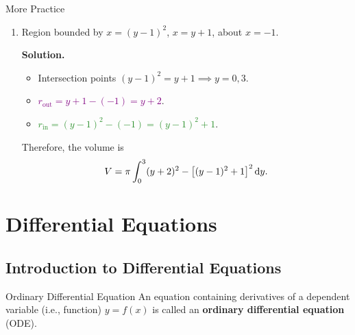 \begin{Example}{More Practice}{}
\begin{enumerate}[label=(\roman*)]
        \item Region bounded by $ x=(y-1)^2 $, $ x=y+1 $, about $ x=-1 $.
              \begin{center}
              \end{center}
              \textbf{Solution.}
              \begin{itemize}
                  \item Intersection points $ (y-1)^2=y+1\implies y=0,3 $.
                  \item \textcolor{Purple}{$ r_{\text{out}}=y+1-(-1)=y+2 $}.
                  \item \textcolor{ForestGreen}{$ r_{\text{in}}=(y-1)^2-(-1)=(y-1)^2+1 $}.
              \end{itemize}
              Therefore, the volume is
              \[ V=\pi \int_{0}^{3} (y+2)^2-\bigl[ (y-1)^2+1 \bigr]^2\odif{y}. \]
    \end{enumerate}
\end{Example}

\chapter{Differential Equations}
\section{Introduction to Differential Equations}
\begin{Definition}{Ordinary Differential Equation}{}
    An equation containing derivatives of a dependent variable (i.e., function) $ y=f(x) $
    is called an \textbf{ordinary differential equation} (ODE).
\end{Definition}


